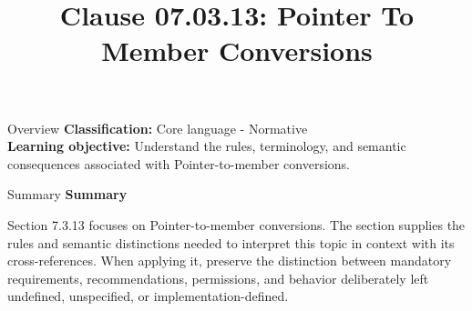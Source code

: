 \documentclass[10pt,letterpaper]{article}
\title{Clause 07.03.13: Pointer To Member Conversions}
\author{}
\date{}
\begin{document}
\maketitle
\begin{CornellOverviewBox}{Overview}
\textbf{Classification:} Core language - Normative\\[2pt]
\textbf{Learning objective:} Understand the rules, terminology, and semantic consequences associated with Pointer-to-member conversions.
\end{CornellOverviewBox}\begin{CornellSummaryBox}{Summary}
{\sffamily\bfseries\color{Accent} Summary}\par\vspace{3pt}Section 7.3.13 focuses on Pointer-to-member conversions. The section supplies the rules and semantic distinctions needed to interpret this topic in context with its cross-references. When applying it, preserve the distinction between mandatory requirements, recommendations, permissions, and behavior deliberately left undefined, unspecified, or implementation-defined.
\end{CornellSummaryBox}
\end{document}

